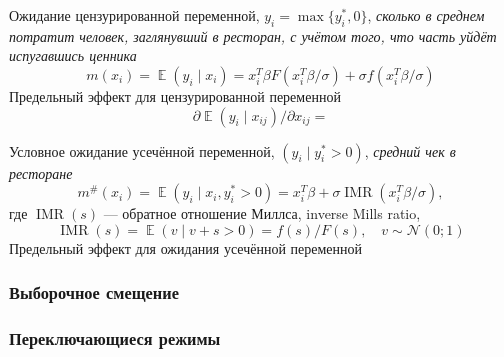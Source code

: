 \documentclass[12pt]{article}
\DeclareMathOperator{\IMR}{IMR} %
\DeclareMathOperator{\E}{\mathbb{E}}
\newcommand{\cN}{\mathcal{N}}
\begin{document}
Ожидание цензурированной переменной, $y_i = \max\{ y_i^*, 0 \}$, \emph{сколько в среднем потратит человек, заглянувший в ресторан, с учётом того, что часть уйдёт испугавшись ценника}
\[
m(x_i) = \E(y_i \mid  x_i) = x_i^T \beta F(x_i^T \beta /\sigma) + \sigma f(x_i^T \beta / \sigma)
\]
Предельный эффект для цензурированной переменной 
\[
\partial \E(y_i \mid  x_{ij})/ \partial x_{ij} = 
\]


Условное ожидание усечённой переменной, $(y_i \mid y_i^* > 0)$, \emph{средний чек в ресторане}
\[
m^\#(x_i) = \E(y_i \mid x_i, y_i^* > 0) = x_i^T \beta  + \sigma \IMR(x_i^T \beta / \sigma),
\]
где $\IMR(s)$ — обратное отношение Миллса, inverse Mills ratio,
\[
\IMR(s) = \E(v \mid v + s > 0) = f(s) / F(s), \quad v\sim \cN(0;1)
\]
Предельный эффект для ожидания усечённой переменной


\subsubsection*{Выборочное смещение}


\subsubsection*{Переключающиеся режимы}




\listoftheorems[ignoreall,show={theorem,definition}]
\end{document}
